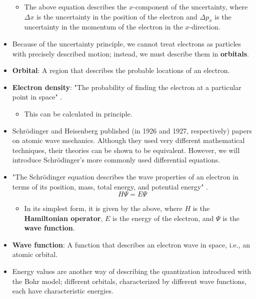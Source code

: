 \documentclass[../notes.tex]{subfiles}
\begin{document}
\begin{itemize}
    \begin{itemize}
        \item The above equation describes the $x$-component of the uncertainty, where $\Delta x$ is the uncertainty in the position of the electron and $\Delta p_x$ is the uncertainty in the momentum of the electron in the $x$-direction.
    \end{itemize}
    \item Because of the uncertainty principle, we cannot treat electrons as particles with precisely described motion; instead, we must describe them in \textbf{orbitals}.
    \item \textbf{Orbital}: A region that describes the probable locations of an electron.
    \item \textbf{Electron density}: "The probability of finding the electron at a particular point in space" \parencite[14]{bib:MiesslerFischerTarr}.
    \begin{itemize}
        \item This can be calculated in principle.
    \end{itemize}
    \item Schr\"{o}dinger and Heisenberg published (in 1926 and 1927, respectively) papers on atomic wave mechanics. Although they used very different mathematical techniques, their theories can be shown to be equivalent. However, we will introduce Schr\"{o}dinger's more commonly used differential equations.
    \item "The Schr\"{o}dinger equation describes the wave properties of an electron in terms of its position, mass, total energy, and potential energy" \parencite[14]{bib:MiesslerFischerTarr}.
    \begin{equation*}
        H\Psi = E\Psi
    \end{equation*}
    \begin{itemize}
        \item In its simplest form, it is given by the above, where $H$ is the \textbf{Hamiltonian operator}, $E$ is the energy of the electron, and $\Psi$ is the \textbf{wave function}.
    \end{itemize}
    \item \textbf{Wave function}: A function that describes an electron wave in space, i.e., an atomic orbital.
    \item Energy values are another way of describing the quantization introduced with the Bohr model; different orbitals, characterized by different wave functions, each have characteristic energies.

\end{itemize}
\end{document}
